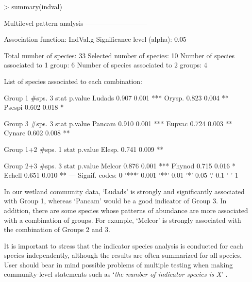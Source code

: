 \documentclass[11pt,a4paper]{article}
\begin{document}
\begin{Schunk}
\begin{Sinput}
> summary(indval) 
\end{Sinput}
\begin{Soutput}
 Multilevel pattern analysis
 ---------------------------

 Association function: IndVal.g
 Significance level (alpha): 0.05

 Total number of species: 33
 Selected number of species: 10 
 Number of species associated to 1 group: 6 
 Number of species associated to 2 groups: 4 

 List of species associated to each combination: 

 Group 1  #sps.  3 
        stat p.value    
Ludads 0.907   0.001 ***
Orysp. 0.823   0.004 ** 
Psespi 0.602   0.018 *  

 Group 3  #sps.  3 
        stat p.value    
Pancam 0.910   0.001 ***
Eupvac 0.724   0.003 ** 
Cynarc 0.602   0.008 ** 

 Group 1+2  #sps.  1 
        stat p.value   
Elesp. 0.741   0.009 **

 Group 2+3  #sps.  3 
        stat p.value    
Melcor 0.876   0.001 ***
Phynod 0.715   0.016 *  
Echell 0.651   0.010 ** 
---
Signif. codes:  0 '***' 0.001 '**' 0.01 '*' 0.05 '.' 0.1 ' ' 1 
\end{Soutput}
\end{Schunk}
In our wetland community data, `Ludads' is strongly and significantly associated with Group 1, whereas `Pancam' would be a good indicator of Group 3. In addition, there are some species whose patterns of abundance are more associated with a combination of groups. For example, `Melcor' is strongly associated with the combination of Groups 2 and 3.

It is important to stress that the indicator species analysis is conducted for each species independently, although the results are often summarized for all species. User should bear in mind possible problems of multiple testing when making community-level statements such as `\emph{the number of indicator species is X}' \citep{DeCaceres2009}\citep{Legendre2012}.
\end{document}
